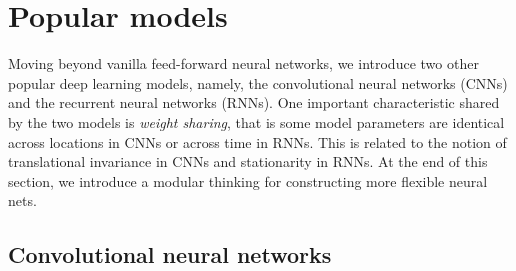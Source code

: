\section{Popular models}\label{sec:pop}


Moving beyond vanilla feed-forward neural networks, we introduce two other popular deep learning models, namely, the convolutional neural networks (CNNs) and the recurrent neural networks
(RNNs). %
One important characteristic shared by the two models is \textit{weight sharing}, that is some model parameters are identical across locations in CNNs or across time in RNNs. This is related to the notion of translational invariance in CNNs and stationarity in RNNs. At the end of this section, we introduce a modular thinking for constructing more flexible neural nets.


\subsection{Convolutional neural networks}\label{sec:CNN}

